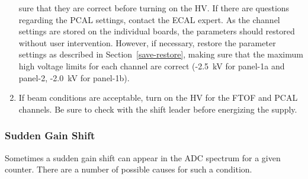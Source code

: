 \documentclass[12pt]{article}
\begin{document}
\begin{enumerate}
sure that they are correct before turning on the HV. If there are questions regarding 
the PCAL settings, contact the ECAL expert. As the channel settings are stored on the
individual boards, the parameters should restored without user intervention. However,
if necessary, restore the parameter settings as described in Section~\ref{save-restore},
making sure that the maximum high voltage limits for each channel are correct (-2.5~kV
for panel-1a and panel-2, -2.0~kV for panel-1b).
\item If beam conditions are acceptable, turn on the HV for the FTOF and PCAL channels. 
Be sure to check with the shift leader before energizing the supply.
\end{enumerate}

\subsubsection{Sudden Gain Shift}
\label{gain-shift}

Sometimes a sudden gain shift can appear in the ADC spectrum for a given counter. There 
are a number of possible causes for such a condition.
\end{document}
